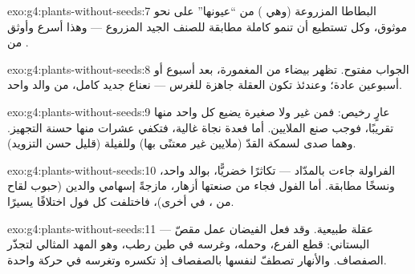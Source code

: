 \begin{solution}{exo:g4:plants-without-seeds:7}
البطاطا المزروعة (وهي )  من ``عيونها'' على نحو موثوق،
وكل  تستطيع أن تنمو  كاملة مطابقة للصنف الجيد المزروع ---
وهذا أسرع وأوثق من .
\end{solution}

\begin{solution}{exo:g4:plants-without-seeds:8}
الجواب مفتوح. تظهر  بيضاء من  المغمورة، بعد أسبوع أو
أسبوعين عادة؛ وعندئذ تكون العقلة جاهزة للغرس --- نعناع جديد
كامل، من والد واحد.
\end{solution}

\begin{solution}{exo:g4:plants-without-seeds:9}
 عارٍ رخيص: فمن غير  ولا  صغيرة يضيع كل واحد
منها تقريبًا، فوجب صنع الملايين. أما  فعدة نجاة غالية، فتكفي
عشرات منها حسنة التجهيز. وهما صدى لسمكة القدّ (ملايين غير معتنًى
بها) وللفيلة (قليل حسن التزويد).
\end{solution}

\begin{solution}{exo:g4:plants-without-seeds:10}
الفراولة جاءت بالمدّاد --- تكاثرًا خضريًّا، بوالد واحد، ونسخًا
مطابقة. أما الفول فجاء من  صنعتها أزهار، مازجةً إسهامي والدين
(حبوب لقاح من ،  في أخرى)، فاختلفت كل  فول اختلافًا
يسيرًا.
\end{solution}

\begin{solution}{exo:g4:plants-without-seeds:11}
 ---  عقلة طبيعية. وقد فعل الفيضان عمل مقصّ
البستاني: قطع الفرع، وحمله، وغرسه في طين رطب، وهو المهد المثالي
لتجذّر الصفصاف. والأنهار تصطفّ لنفسها بالصفصاف إذ تكسره وتغرسه في
حركة واحدة.
\end{solution}
